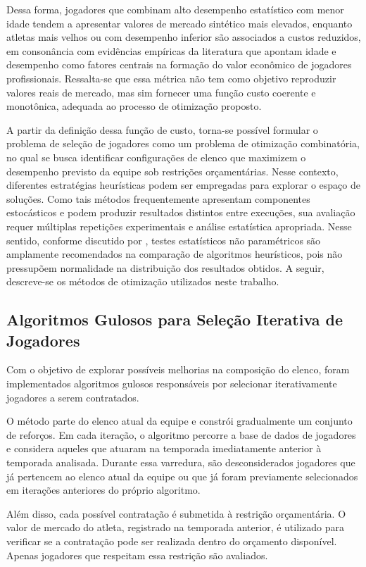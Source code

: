 Dessa forma, jogadores que combinam alto desempenho estatístico com menor idade tendem a apresentar valores de mercado sintético mais elevados, 
enquanto atletas mais velhos ou com desempenho inferior são associados a custos reduzidos, em consonância com evidências empíricas da literatura que 
apontam idade e desempenho como fatores centrais na formação do valor econômico de jogadores profissionais. \cite{frick2007,muller2017}
Ressalta-se que essa métrica não tem como objetivo reproduzir valores reais de mercado, 
mas sim fornecer uma função custo coerente e monotônica, adequada ao processo de otimização proposto.

A partir da definição dessa função de custo, torna-se possível formular o problema de seleção de jogadores como um problema de otimização combinatória, 
no qual se busca identificar configurações de elenco que maximizem o desempenho previsto da equipe sob restrições orçamentárias. Nesse contexto, 
diferentes estratégias heurísticas podem ser empregadas para explorar o espaço de soluções. Como tais métodos frequentemente apresentam componentes 
estocásticos e podem produzir resultados distintos entre execuções, sua avaliação requer múltiplas repetições experimentais e análise estatística apropriada. 
Nesse sentido, conforme discutido por \cite{Derrac2011}, testes estatísticos não paramétricos são amplamente recomendados na comparação de algoritmos heurísticos, 
pois não pressupõem normalidade na distribuição dos resultados obtidos. A seguir, descreve-se os métodos de otimização utilizados neste trabalho.

\subsection{Algoritmos Gulosos para Seleção Iterativa de Jogadores}

Com o objetivo de explorar possíveis melhorias na composição do elenco, foram implementados algoritmos gulosos responsáveis por selecionar iterativamente 
jogadores a serem contratados.

O método parte do elenco atual da equipe e constrói gradualmente um conjunto de reforços. Em cada iteração, o algoritmo percorre a base de dados 
de jogadores e considera aqueles que atuaram na temporada imediatamente anterior à temporada analisada. Durante essa varredura, são desconsiderados 
jogadores que já pertencem ao elenco atual da equipe ou que já foram previamente selecionados em iterações anteriores do próprio algoritmo.

Além disso, cada possível contratação é submetida à restrição orçamentária. O valor de mercado do atleta, registrado na temporada anterior, é utilizado 
para verificar se a contratação pode ser realizada dentro do orçamento disponível. Apenas jogadores que respeitam essa restrição são avaliados.

